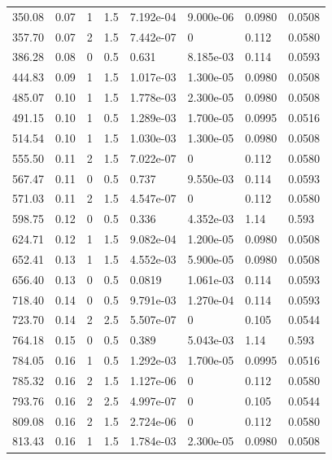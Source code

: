 \documentclass[preview]{standalone}
\begin{document}
{{\begin{tabular}{L{1.2cm}C{1.2cm} C{0.3cm}C{0.5cm} C{1.4cm}C{1.4cm} C{1.4cm}C{1.4cm}}
  350.08  &  0.07  & 1     & 1.5 &  7.192e-04  & 9.000e-06  & 0.0980 &  0.0508   \\ 
  357.70  &  0.07  & 2     & 1.5 &  7.442e-07  & 0  & 0.112 &  0.0580   \\ 
  386.28  &  0.08  & 0     & 0.5 &  0.631  & 8.185e-03  & 0.114 &  0.0593   \\ 
  444.83  &  0.09  & 1     & 1.5 &  1.017e-03  & 1.300e-05  & 0.0980 &  0.0508   \\ 
  485.07  &  0.10  & 1     & 1.5 &  1.778e-03  & 2.300e-05  & 0.0980 &  0.0508   \\ 
  491.15  &  0.10  & 1     & 0.5 &  1.289e-03  & 1.700e-05  & 0.0995 &  0.0516   \\ 
  514.54  &  0.10  & 1     & 1.5 &  1.030e-03  & 1.300e-05  & 0.0980 &  0.0508   \\ 
  555.50  &  0.11  & 2     & 1.5 &  7.022e-07  & 0  & 0.112 &  0.0580   \\ 
  567.47  &  0.11  & 0     & 0.5 &  0.737  & 9.550e-03  & 0.114 &  0.0593   \\ 
  571.03  &  0.11  & 2     & 1.5 &  4.547e-07  & 0  & 0.112 &  0.0580   \\ 
  598.75  &  0.12  & 0     & 0.5 &  0.336  & 4.352e-03  & 1.14 &  0.593   \\ 
  624.71  &  0.12  & 1     & 1.5 &  9.082e-04  & 1.200e-05  & 0.0980 &  0.0508   \\ 
  652.41  &  0.13  & 1     & 1.5 &  4.552e-03  & 5.900e-05  & 0.0980 &  0.0508   \\ 
  656.40  &  0.13  & 0     & 0.5 &  0.0819  & 1.061e-03  & 0.114 &  0.0593   \\ 
  718.40  &  0.14  & 0     & 0.5 &  9.791e-03  & 1.270e-04  & 0.114 &  0.0593   \\ 
  723.70  &  0.14  & 2     & 2.5 &  5.507e-07  & 0  & 0.105 &  0.0544   \\ 
  764.18  &  0.15  & 0     & 0.5 &  0.389  & 5.043e-03  & 1.14 &  0.593   \\ 
  784.05  &  0.16  & 1     & 0.5 &  1.292e-03  & 1.700e-05  & 0.0995 &  0.0516   \\ 
  785.32  &  0.16  & 2     & 1.5 &  1.127e-06  & 0  & 0.112 &  0.0580   \\ 
  793.76  &  0.16  & 2     & 2.5 &  4.997e-07  & 0  & 0.105 &  0.0544   \\ 
  809.08  &  0.16  & 2     & 1.5 &  2.724e-06  & 0  & 0.112 &  0.0580   \\ 
  813.43  &  0.16  & 1     & 1.5 &  1.784e-03  & 2.300e-05  & 0.0980 &  0.0508   \\ 

\end{tabular}}}
\end{document}
